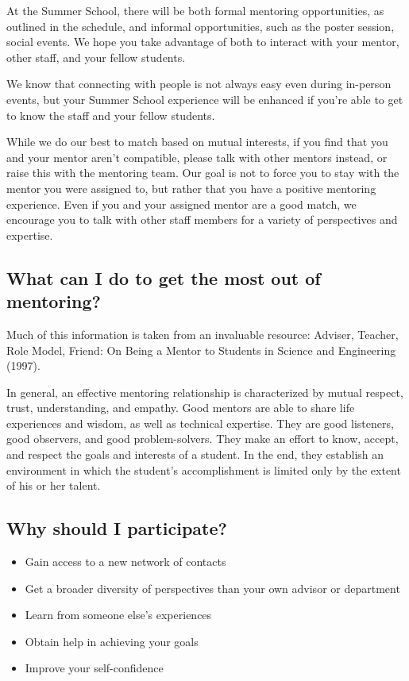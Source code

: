 \documentclass[titlepage]{article}
\begin{document}
At the Summer School, there will be both formal mentoring opportunities, as outlined in the schedule, and informal opportunities, such as the poster session, social events.  We hope you take advantage of both to interact with your mentor, other staff, and your fellow students.

We know that connecting with people is not always easy even during in-person events, but your Summer School experience will be enhanced if you're able to get to know the staff and your fellow students.

While we do our best to match based on mutual interests, if you find that you and your mentor aren't compatible, please talk with other mentors instead, or raise this with the mentoring team. Our goal is not to force you to stay with the mentor you were assigned to, but rather that you have a positive mentoring experience. Even if you and your assigned mentor are a good match, we encourage you to talk with other staff members for a variety of perspectives and expertise.

\subsection{What can I do to get the most out of mentoring?}
\label{sec:orgf50dc86}
Much of this information is taken from an invaluable resource: Adviser, Teacher, Role Model, Friend: On Being a Mentor to Students in Science and Engineering (1997).

In general, an effective mentoring relationship is characterized by mutual respect, trust, understanding, and empathy. Good mentors are able to share life experiences and wisdom, as well as technical expertise. They are good listeners, good observers, and good problem-solvers. They make an effort to know, accept, and respect the goals and interests of a student. In the end, they establish an environment in which the student's accomplishment is limited only by the extent of his or her talent.

\subsection{Why should I participate?}
\label{sec:org850cdfd}
\begin{itemize}
\item Gain access to a new network of contacts
\item Get a broader diversity of perspectives than your own advisor or department
\item Learn from someone else's experiences
\item Obtain help in achieving your goals
\item Improve your self-confidence
\end{itemize}
\end{document}
